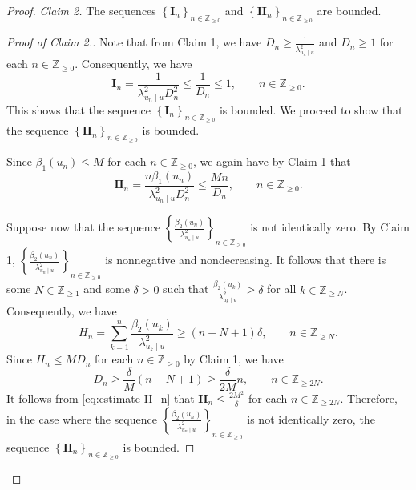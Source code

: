 \documentclass[11pt, reqno, a4paper]{amsart}
\theoremstyle{definition}
\renewcommand{\le}{\leqslant}
\renewcommand{\ge}{\geqslant}
\newcommand{\Z}{\mathbb Z}
\numberwithin{equation}{section}
\begin{document}
\begin{proof}
    \textit{Claim 2.} The sequences $\left\{ \mathbf{I}_n \right\}_{n \in \Z_{\ge 0}}$ and $\left\{ \mathbf{II}_n \right\}_{n \in \Z_{\ge 0}}$ are bounded. 
    \begin{proof}[Proof of Claim 2.] Note that from Claim 1, we have $D_n \ge \frac{1}{\lambda_{u_n \mid u} ^{2}}$ and $D_n \ge 1$ for each $n \in \Z_{\ge 0}$. Consequently, we have
    \begin{equation*}
        \mathbf{I}_n = \frac{1}{\lambda_{u_n \mid u} ^{2} D_n ^{2}} \le \frac{1}{D_n} \le 1, \qquad n \in \Z_{\ge 0}.
    \end{equation*}
    This shows that the sequence $\left\{ \mathbf{I}_n \right\}_{n \in \Z_{\ge 0}}$ is bounded. We proceed to show that the sequence $\left\{ \mathbf{II}_n \right\}_{n \in \Z_{\ge 0}}$ is bounded.
    
    Since $\beta_1 (u_n) \le M$ for each $n \in \Z_{\ge 0}$, we again have by Claim 1 that 
    \begin{equation}
        \mathbf{II}_n = \frac{n \beta_1 (u_n)}{\lambda_{u_n \mid u}^2 D_n ^{2}} \le \frac{M n}{D_n}, \qquad n \in \Z_{\ge 0}.
        \label{eq:estimate-II_n}
    \end{equation}

    Suppose now that the sequence $\left\{ \frac{\beta_2 (u_n)}{\lambda_{u_n \mid u} ^2} \right\}_{n \in \Z_{\ge 0}}$ is not identically zero. By Claim 1, $\left\{ \frac{\beta_2 (u_n)}{\lambda_{u_n \mid u} ^2} \right\}_{n \in \Z_{\ge 0}}$ is nonnegative and nondecreasing. It follows that there is some $N \in \Z_{\ge 1}$ and some $\delta > 0$ such that $\frac{\beta_2 (u_k)}{\lambda_{u_k \mid u} ^2} \ge \delta$ for all $k \in \Z_{\ge N}$. Consequently, we have
    \begin{equation*}
        H_n = \sum_{k=1}^{n} \frac{\beta_2 (u_k)}{\lambda_{u_k \mid u} ^2} \ge (n-N+1)\delta, \qquad n \in \Z_{\ge N}.
    \end{equation*}
    Since $H_n \le M D_n$ for each $n \in \Z_{\ge 0}$ by Claim 1, we have
    \begin{equation*}
        D_n \ge \frac{\delta}{M} (n-N+1) \ge \frac{\delta}{2M}n, \qquad n \in \Z_{\ge 2N}.
    \end{equation*}
    It follows from \eqref{eq:estimate-II_n} that $\mathbf{II}_n \le \frac{2M^2}{\delta}$ for each $n \in \Z_{\ge 2N}$. Therefore, in the case where the sequence $\left\{ \frac{\beta_2 (u_n)}{\lambda_{u_n \mid u} ^2} \right\}_{n \in \Z_{\ge 0}}$ is not identically zero, the sequence $\left\{ \mathbf{II}_n \right\}_{n \in \Z_{\ge 0}}$ is bounded.


\end{proof}
\end{proof}
\end{document}
